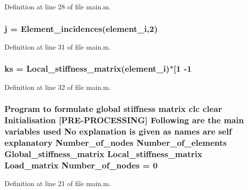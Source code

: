 Definition at line 28 of file main.\+m.

\hypertarget{a00007_abf2bc2545a4a5f5683d9ef3ed0d977e0}{}
\subsubsection[{j}]{\setlength{\rightskip}{0pt plus 5cm}j = {\bf Element\+\_\+incidences}({\bf element\+\_\+i},2)}\label{a00007_abf2bc2545a4a5f5683d9ef3ed0d977e0}


Definition at line 31 of file main.\+m.

\hypertarget{a00007_a0b4fbdd467cb846f22c44ad1178c22d4}{}
\subsubsection[{ks}]{\setlength{\rightskip}{0pt plus 5cm}ks = Local\+\_\+stiffness\+\_\+matrix({\bf element\+\_\+i})$\ast$\mbox{[}1 -\/1}\label{a00007_a0b4fbdd467cb846f22c44ad1178c22d4}


Definition at line 32 of file main.\+m.

\hypertarget{a00007_a1d65c23ed4744bf98747671b08490b5c}{}
\subsubsection[{Number\+\_\+of\+\_\+nodes}]{\setlength{\rightskip}{0pt plus 5cm}Program to formulate global stiffness matrix clc clear Initialisation \mbox{[}P\+R\+E-\/P\+R\+O\+C\+E\+S\+S\+I\+N\+G\mbox{]} Following are the main variables used No explanation is given as names are self explanatory Number\+\_\+of\+\_\+nodes Number\+\_\+of\+\_\+elements {\bf Global\+\_\+stiffness\+\_\+matrix} Local\+\_\+stiffness\+\_\+matrix Load\+\_\+matrix Number\+\_\+of\+\_\+nodes = 0}\label{a00007_a1d65c23ed4744bf98747671b08490b5c}


Definition at line 21 of file main.\+m.

